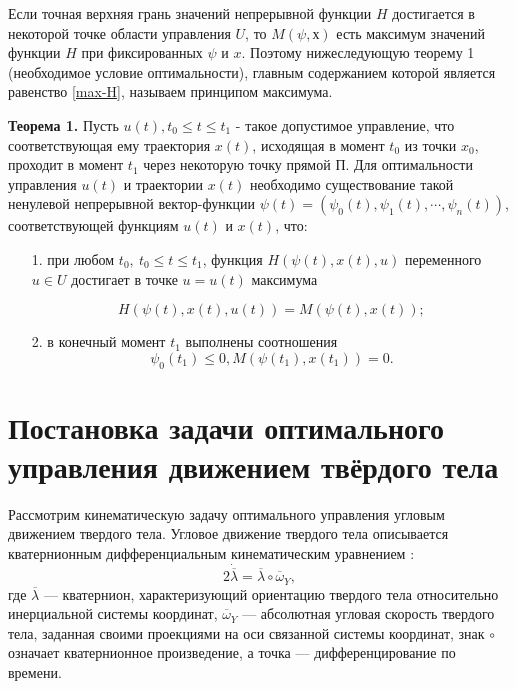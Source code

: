 \documentclass[14pt]{extreport}
\begin{document}
Если точная верхняя грань значений непрерывной функ­ции $H$ достигается в некоторой точке области управления $U$, то $M(\psi, х)$ есть максимум значений функ­ции $H$ при фиксированных $\psi$ и $x$. Поэтому нижеследую­щую теорему 1 (необходимое условие оптимальности), главным содержанием которой является равенство \eqref{max-H}, называем принципом максимума.

\textbf{Теорема 1.} Пусть $u(t), t_0 \leq t \leq t_1$ - такое допустимое управление, что соответствующая ему траекто­рия $x(t)$, исходящая в момент $t_0$ из точки $x_0$, проходит в момент $t_1$ через некоторую точку прямой П. Для оптимальности управления $u(t)$ и траектории $x(t)$ необходимо существование такой ненулевой непрерыв­ной вектор-функции $\psi(t)=(\psi_0(t),\psi_1(t),\cdots,\psi_n(t))$, со­ответствующей функциям $u(t)$ и $x(t)$, что:
\begin{itemize}
\item[1.] при любом $t_0,\ t_0 \leq t \leq t_1$, функция $H(\psi(t),x(t),u)$ переменного $u\in U$ достигает в точке $u = u(t)$ макси­мума 

\begin{equation}
\label{max-H}
H(\psi(t),x(t),u(t))=M(\psi(t),x(t));
\end{equation}
\item[2.] в конечный момент $t_1$ выполнены соотношения
\begin{equation}
\label{fin-ratio}
\psi_0(t_1) \leq 0, M(\psi(t_1),x(t_1))=0.
\end{equation}
\end{itemize}

\chapter{Постановка задачи оптимального управления движением твёрдого тела}
Рассмотрим кинематическую задачу оптимального управления угло­вым движением твердого тела. Угловое движение твердого тела описыва­ется кватернионным дифференциальным кинематическим уравнением \cite{buhgolz}:
\begin{equation}
\label{diff-kinematic-eq}
2\dot{\overline{\lambda}} = \overline{\lambda} \circ \overline{\omega}_{Y},
\end{equation}
где $\overline{\lambda}$ — кватернион, характеризующий ориентацию твердого тела относи­тельно инерциальной системы координат, $\overline{\omega}_{Y}$ — абсолютная угловая скорость твердого тела, заданная своими проекциями на оси связанной си­стемы координат, знак $\circ$ означает кватернионное произведение, а точка — дифференцирование по времени. 
\end{document}
